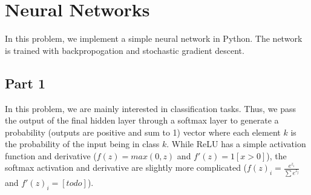 \section{Neural Networks} \label{sec:prob1}
In this problem, we implement a simple neural network in Python.
The network is trained with backpropogation and stochastic gradient descent.

\subsection{Part 1}
In this problem, we are mainly interested in classification tasks.
Thus, we pass the output of the final hidden layer through a softmax layer to generate a probability (outputs are positive and sum to 1) vector where each element $k$ is the probability of the input being in class $k$.
While ReLU has a simple activation function and derivative ($f(z) = max(0, z)$ and $f'(z) = 1[x > 0]$), the softmax activation and derivative are slightly more complicated ($f(z)_i = \frac{e^{z_i}}{\sum{e^{z_j}}}$ and $f'(z)_i = [todo]$).